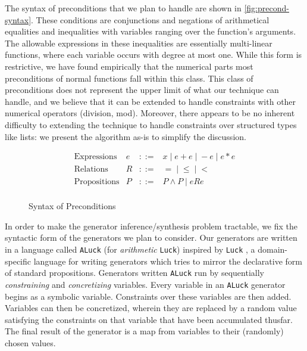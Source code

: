 \documentclass[sigconf,nonacm]{acmart}
\begin{document}
The syntax of preconditions that we plan to handle are shown in \autoref{fig:precond-syntax}. These conditions are conjunctions and negations of arithmetical equalities and inequalities with variables ranging over the function's arguments. The allowable expressions in these inequalities are essentially multi-linear functions, where each variable occurs with degree at most one. While this form is restrictive, we have found empirically that the numerical parts most preconditions of normal functions fall within this class. This class of preconditions does not represent the upper limit of what our technique can handle, and we believe that it can be extended to handle constraints with other numerical operators (division, mod). Moreover, there appears to be no inherent difficulty to extending the technique to handle constraints over structured types like lists: we present the algorithm as-is to simplify the discussion.

\begin{figure}
\caption{Syntax of Preconditions}
\label{fig:precond-syntax}
$$
\begin{array}{llll}
\text{Expressions} & e & ::= & x \; | \; e + e \; | \; -e \;|\; e*e\\
\text{Relations} & R & ::= & = \;|\; \leq \;|\; <\\
\text{Propositions} & P & ::= & P \wedge P \;|\; e R e\\
\end{array}
$$
\end{figure}

In order to make the generator inference/synthesis problem tractable, we fix the syntactic form of the generators we plan to consider. Our generators are written in a language called \texttt{ALuck} (for \textit{arithmetic} \texttt{Luck}) inspired by \texttt{Luck} \cite{luck}, a domain-specific language for writing generators which tries to mirror the declarative form of standard propositions. Generators written \texttt{ALuck} run by sequentially \textit{constraining} and \textit{concretizing} variables. Every variable in an \texttt{ALuck} generator begins as a symbolic variable. Constraints over these variables are then added. Variables can then be concretized, wherein they are replaced by a random value satisfying the constraints on that variable that have been accumulated thusfar. The final result of the generator is a map from variables to their (randomly) chosen values.
\end{document}
